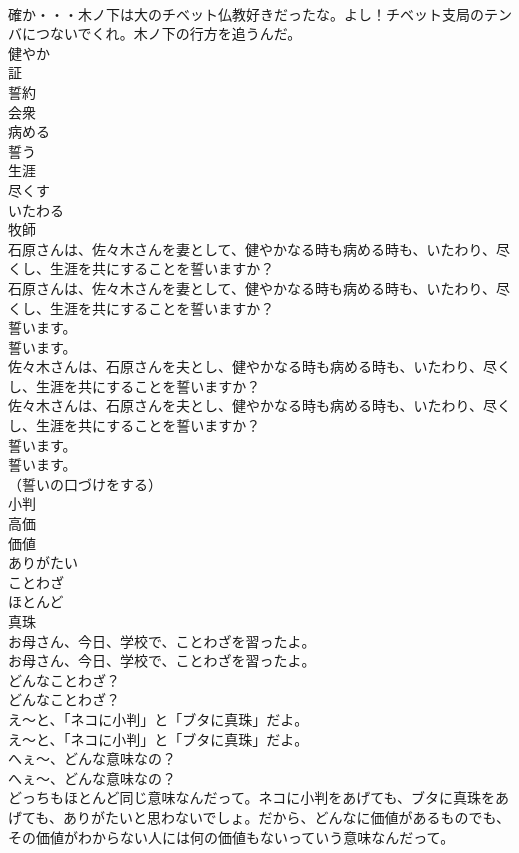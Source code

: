 \documentclass[8pt]{extreport}
\begin{document}
\begin{CJK}{UTF8}{min}
\\	確か・・・木ノ下は大のチベット仏教好きだったな。よし！チベット支局のテンバにつないでくれ。木ノ下の行方を追うんだ。	
\\	健やか
\\	証
\\	誓約
\\	会衆
\\	病める
\\	誓う
\\	生涯
\\	尽くす
\\	いたわる
\\	牧師
\\	石原さんは、佐々木さんを妻として、健やかなる時も病める時も、いたわり、尽くし、生涯を共にすることを誓いますか？	
\\	石原さんは、佐々木さんを妻として、健やかなる時も病める時も、いたわり、尽くし、生涯を共にすることを誓いますか？ 
\\	誓います。	
\\	誓います。 
\\	佐々木さんは、石原さんを夫とし、健やかなる時も病める時も、いたわり、尽くし、生涯を共にすることを誓いますか？	
\\	佐々木さんは、石原さんを夫とし、健やかなる時も病める時も、いたわり、尽くし、生涯を共にすることを誓いますか？ 
\\	誓います。	
\\	誓います。 
\\	（誓いの口づけをする）	
\\	小判
\\	高価
\\	価値
\\	ありがたい
\\	ことわざ
\\	ほとんど
\\	真珠
\\	お母さん、今日、学校で、ことわざを習ったよ。	
\\	お母さん、今日、学校で、ことわざを習ったよ。 
\\	どんなことわざ？	
\\	どんなことわざ？ 
\\	え～と、「ネコに小判」と「ブタに真珠」だよ。	
\\	え～と、「ネコに小判」と「ブタに真珠」だよ。 
\\	へぇ～、どんな意味なの？	
\\	へぇ～、どんな意味なの？ 
\\	どっちもほとんど同じ意味なんだって。ネコに小判をあげても、ブタに真珠をあげても、ありがたいと思わないでしょ。だから、どんなに価値があるものでも、その価値がわからない人には何の価値もないっていう意味なんだって。	

\end{CJK}
\end{document}

